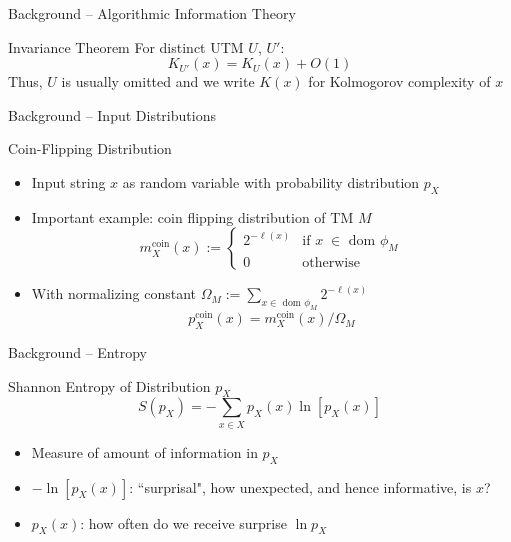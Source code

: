 \begin{frame}{Background -- Algorithmic Information Theory}
    \begin{block}{Invariance Theorem}
    For distinct UTM $U$, $U'$:
        \begin{equation*}
            K_{U'}(x) = K_U(x) + O(1)
        \end{equation*}
        Thus, $U$ is usually omitted and we write $K(x)$ for Kolmogorov complexity of $x$
    \end{block}
\end{frame}

\begin{frame}{Background -- Input Distributions}
\begin{block}{Coin-Flipping Distribution}
\begin{itemize}
    \item Input string $x$ as random variable with probability distribution $p_X$
    \item Important example: coin flipping distribution of TM $M$
    \begin{equation*}
        m_X^\text{coin}(x) := \begin{cases} 2^{-\ell(x)} &\text{if $x\;\in$ dom $\phi_M$}\\ 0 &\text{otherwise}\end{cases}
    \end{equation*}
    \item With normalizing constant $\Omega_M :=\sum_{x\in\text{ dom }\phi_M} 2^{-\ell(x)}$
    \begin{equation*}
        p_X^\text{coin}(x) = m_X^\text{coin}(x)/\Omega_M
    \end{equation*}
\end{itemize}
\end{block}
\end{frame}


\begin{frame}{Background -- Entropy}
    \begin{block}{Shannon Entropy of Distribution $p_X$}
    \begin{equation*}
    S(p_X) = - \sum_{x\in X} p_X(x)\ln [p_X(x)]    
    \end{equation*}
    \begin{itemize}
        \item Measure of amount of information in $p_X$
        \item $-\ln[p_X(x)]$: ``surprisal", how unexpected, and hence informative, is $x$?
        \item $p_X(x)$: how often do we receive surprise $\ln p_X$
    \end{itemize}
    \end{block}
\end{frame}

